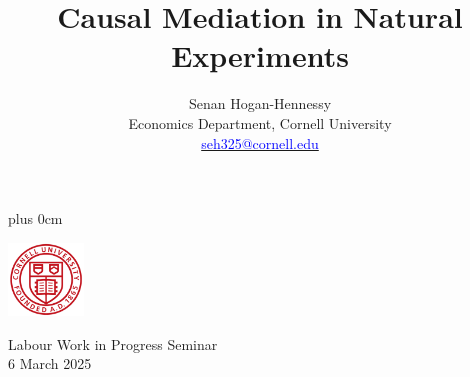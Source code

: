 \documentclass[dvipsnames]{beamer} %
\title{\color{titleText}
    Causal Mediation in Natural Experiments
}
\author[Senan Hogan-Hennessy, Cornell University]{
    Senan Hogan-Hennessy \\
    Economics Department, Cornell University \\ %
    \href{mailto:seh325@cornell.edu}{\textcolor{blue}{seh325@cornell.edu}}
}
\date{} %
\renewcommand{\raggedright}{\leftskip=0pt \rightskip=0pt plus 0cm}
\begin{document}
\raggedright
\begin{frame}
    \titlepage
    \vspace{-1.5cm}
    \begin{center}
        \includegraphics[width=2cm]{presentation-files/cornell}

        \vspace{0.5cm}
        Labour Work in Progress Seminar \\
        6 March 2025
    \end{center}
\end{frame}

\end{document}
